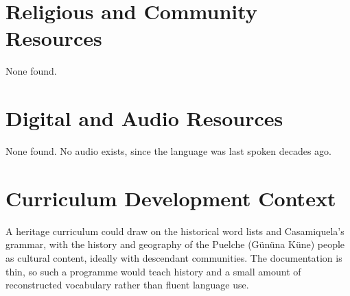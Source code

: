 \documentclass[12pt]{article}
\begin{document}
\section{Religious and Community Resources}
None found.

\section{Digital and Audio Resources}
None found. No audio exists, since the language was last spoken decades ago.

\section{Curriculum Development Context}
A heritage curriculum could draw on the historical word lists and Casamiquela's grammar, with the history and geography of the Puelche (Gününa Küne) people as cultural content, ideally with descendant communities. The documentation is thin, so such a programme would teach history and a small amount of reconstructed vocabulary rather than fluent language use.
\end{document}
